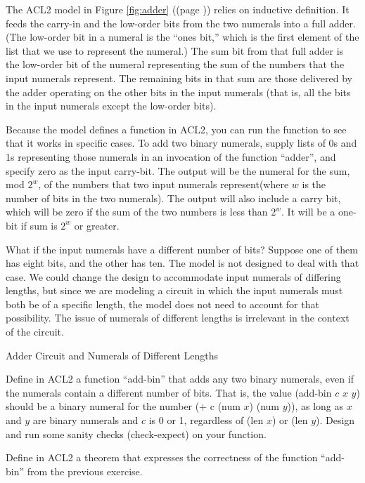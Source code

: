 The ACL2 model in Figure \ref{fig:adder} ((page \pageref{fig:adder})) relies
on inductive definition. It feeds the carry-in and
the low-order bits from the two numerals into a full adder.
(The low-order bit in a numeral is the ``ones bit,''
which is the first element of the list that we use to
represent the numeral.)
The sum bit from that full adder
is the low-order bit of the numeral representing the sum of
the numbers that the input numerals represent.
The remaining bits in that sum are those delivered by
the adder operating on the other bits in the input numerals
(that is, all the bits in the input numerals except the low-order bits).

Because the model defines a function in ACL2,
you can run the function to see that it works in specific cases.
To add two binary numerals, supply lists of 0s and 1s
representing those numerals in an invocation
of the function ``adder'', and specify zero as the input carry-bit.
The output will be the numeral for the sum, mod $2^w$,
of the numbers that two input
numerals represent(where $w$ is the number of bits in the two numerals).
The output will also include a carry bit,
which will be zero if the sum of the two numbers is less than $2^w$.
It will be a one-bit if sum is $2^w$ or greater.

\begin{aside}
What if the input numerals have a different number of bits?
Suppose one of them has eight bits, and the other has ten.
The model is not designed to deal with that case.
We could change the design to accommodate input numerals
of differing lengths, but since we are modeling a circuit
in which the input numerals must both be of a specific length,
the model does not need to account for that possibility.
The issue of numerals of different lengths
is irrelevant in the context of the circuit.
\caption{Adder Circuit and Numerals of Different Lengths}
\label{adder-circuit-and-numerals-of-different-lengths}
\end{aside}

\begin{ExerciseList}
\Exercise Define in ACL2 a function ``add-bin''
that adds any two binary numerals,
even if the numerals contain a different number of bits.
That is, the value (add-bin $c$ $x$ $y$) should be a binary numeral
for the number (+ c (num $x$) (num $y$)),
as long as $x$ and $y$ are binary numerals and $c$ is 0 or 1,
regardless of (len $x$) or (len $y$).
Design and run some sanity checks (check-expect) on your function.

\Exercise Define in ACL2 a theorem that expresses the correctness
of the function ``add-bin'' from the previous exercise.
\end{ExerciseList}

